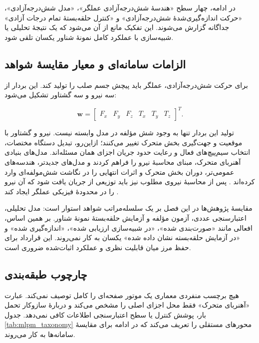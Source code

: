 در ادامه، چهار سطح «هندسهٔ شش‌درجه‌آزادی عملگر»، «مدل شش‌درجه‌آزادی»، «حرکت اندازه‌گیری‌شدهٔ شش‌درجه‌آزادی» و «کنترل حلقه‌بستهٔ تمام درجات آزادی» جداگانه گزارش می‌شوند. این تفکیک مانع از آن می‌شود که یک نتیجهٔ تحلیلی یا شبیه‌سازی با عملکرد کامل نمونهٔ شناور یکسان تلقی شود.

\subsection{الزامات سامانه‌ای و معیار مقایسهٔ شواهد}
\label{subsec:six_dof_requirements}

برای حرکت شش‌درجه‌آزادی، عملگر باید پیچش جسم صلب را تولید کند. این بردار از سه نیرو و سه گشتاور تشکیل می‌شود:

\begin{equation}
	\mathbf{w}
	=
	\begin{bmatrix}
		F_x & F_y & F_z & T_x & T_y & T_z
	\end{bmatrix}^{T}.
\end{equation}

تولید این بردار تنها به وجود شش مؤلفه در مدل وابسته نیست. نیرو و گشتاور با موقعیت و جهت‌گیری بخش متحرک تغییر می‌کنند؛ ازاین‌رو، تبدیل دستگاه مختصات، انتخاب سیم‌پیچ‌های فعال و رعایت حدود جریان اجزای همان مسئله‌اند. مدل‌های بنیادی آهنربای متحرک، مبنای محاسبهٔ نیرو را فراهم کردند \cite{jansenModelingMagneticallyLevitated2007} و مدل‌های جدیدتر، هندسه‌های عمومی‌تر، دوران بخش متحرک و اثرات انتهایی را در نگاشت شش‌مولفه‌ای وارد کرده‌اند \cite{hu6DOFExtendedUnified2024,huDynamicModelingApproach2025,wangThreedimensionalElectromagneticAnalytical2025}. پس از محاسبهٔ نیروی مطلوب نیز باید توزیعی از جریان یافت شود که آن نیرو را در محدودهٔ فیزیکی عملگر ایجاد کند \cite{wangNovelAlgorithmForce2025}.

مقایسهٔ پژوهش‌ها در این فصل بر یک سلسله‌مراتب شواهد استوار است: مدل تحلیلی، اعتبارسنجی عددی، آزمون مؤلفه و آزمایش حلقه‌بستهٔ نمونهٔ شناور. بر همین اساس، افعالی مانند «صورت‌بندی شده»، «در شبیه‌سازی ارزیابی شده»، «اندازه‌گیری شده» و «در آزمایش حلقه‌بسته نشان داده شده» یکسان به کار نمی‌روند. این قرارداد برای حفظ مرز میان قابلیت نظری و عملکرد اثبات‌شده ضروری است.

\subsection{چارچوب طبقه‌بندی}
\label{subsec:taxonomy_framework}

هیچ برچسب منفردی معماری یک موتور صفحه‌ای را کامل توصیف نمی‌کند. عبارت «آهنربای متحرک» فقط محل اجزای اصلی را مشخص می‌کند و دربارهٔ سازوکار تحمل بار، پوشش کنترل یا سطح اعتبارسنجی اطلاعات کافی نمی‌دهد. جدول \ref{tab:mlpm_taxonomy} محورهای مستقلی را تعریف می‌کند که در ادامه برای مقایسهٔ سامانه‌ها به کار می‌روند.

